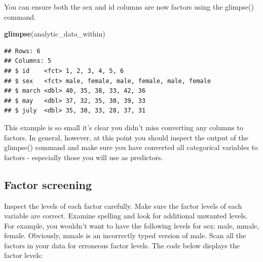 \documentclass[
]{krantz}
\makeatletter
\newenvironment{Shaded}{\begin{snugshade}}{\end{snugshade}}
\newcommand{\DataTypeTok}[1]{\textcolor[rgb]{0.27,0.27,0.27}{#1}}
\newcommand{\KeywordTok}[1]{\textcolor[rgb]{0.27,0.27,0.27}{\textbf{#1}}}
\newcommand{\NormalTok}[1]{#1}
\newcommand{\OperatorTok}[1]{\textcolor[rgb]{0.43,0.43,0.43}{\textbf{#1}}}
\newcommand{\StringTok}[1]{\textcolor[rgb]{0.5,0.5,0.5}{#1}}
\newenvironment{kframe}{%
\medskip{}
\setlength{\fboxsep}{.8em}
 \def\at@end@of@kframe{}%
 \ifinner\ifhmode%
  \def\at@end@of@kframe{\end{minipage}}%
  \begin{minipage}{\columnwidth}%
 \fi\fi%
 \def\FrameCommand##1{\hskip\@totalleftmargin \hskip-\fboxsep
 \colorbox{shadecolor}{##1}\hskip-\fboxsep
     \hskip-\linewidth \hskip-\@totalleftmargin \hskip\columnwidth}%
 \MakeFramed {\advance\hsize-\width
   \@totalleftmargin\z@ \linewidth\hsize
   \@setminipage}}%
 {\par\unskip\endMakeFramed%
 \at@end@of@kframe}
\renewenvironment{Shaded}{\begin{kframe}}{\end{kframe}}
\makeatother
\begin{document}
\begin{Shaded}
\end{Shaded}

You can ensure both the sex and id columns are now factors using the glimpse() command.

\begin{Shaded}
\begin{Highlighting}[]
\KeywordTok{glimpse}\NormalTok{(analytic_data_within)}
\end{Highlighting}
\end{Shaded}

\begin{verbatim}
## Rows: 6
## Columns: 5
## $ id    <fct> 1, 2, 3, 4, 5, 6
## $ sex   <fct> male, female, male, female, male, female
## $ march <dbl> 40, 35, 38, 33, 42, 36
## $ may   <dbl> 37, 32, 35, 30, 39, 33
## $ july  <dbl> 35, 30, 33, 28, 37, 31
\end{verbatim}

This example is so small it's clear you didn't miss converting any columns to factors. In general, however, at this point you should inspect the output of the glimpse() command and make sure you have converted all categorical variables to factors - especially those you will use as predictors.

\hypertarget{factor-screening-1}{%
\subsection{Factor screening}\label{factor-screening-1}}

Inspect the levels of each factor carefully. Make sure the factor levels of each variable are correct. Examine spelling and look for additional unwanted levels. For example, you wouldn't want to have the following levels for sex: male, mmale, female. Obviously, mmale is an incorrectly typed version of male. Scan all the factors in your data for erroneous factor levels. The code below displays the factor levels:

\begin{Shaded}
\end{Shaded}
\end{document}
